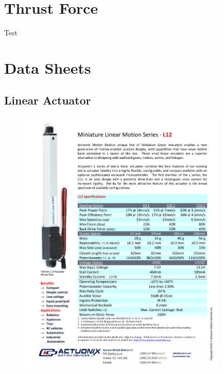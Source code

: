 \documentclass[../main.tex]{subfiles}
\begin{document}
\appendix
	\chapter{Thrust Force}
	Test
	
\chapter{Data Sheets} \label{appendix:DataSheets}

\section{Linear Actuator \cite{LinearActuator}} \label{LinAct}
\begin{figure}[H]
	\centering
	\includegraphics[width=0.9\textwidth]{img/specs/Actuonix+L12+Datasheet.pdf}
\end{figure}
\end{document}
